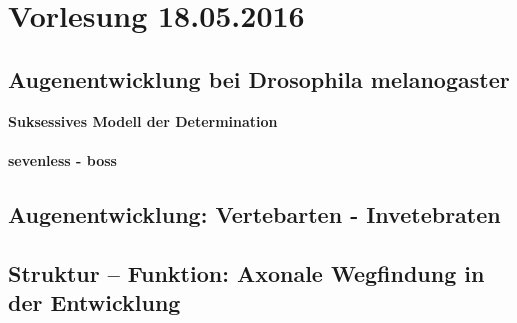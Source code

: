 \section{Vorlesung 18.05.2016}

\subsection{Augenentwicklung bei Drosophila melanogaster}

\textbf{Suksessives Modell der Determination}
\\\\
\textbf{sevenless - boss}

\subsection{Augenentwicklung: Vertebarten - Invetebraten}

\subsection{Struktur -- Funktion: Axonale Wegfindung in der Entwicklung}